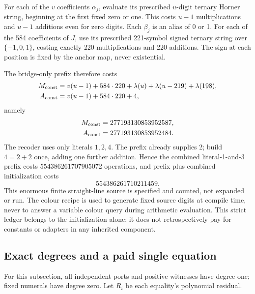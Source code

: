 \documentclass[11pt,letterpaper]{article}
\theoremstyle{definition}\newtheorem{definition}[theorem]{Definition}
\theoremstyle{remark}\newtheorem{remark}[theorem]{Remark}
\begin{document}
For each of the $v$ coefficients $\alpha_j$, evaluate its prescribed $u$-digit ternary Horner string, beginning at the first fixed zero or one. This costs $u-1$ multiplications and $u-1$ additions even for zero digits. Each $\beta_j$ is an alias of 0 or 1. For each of the 584 coefficients of $J$, use its prescribed 221-symbol signed ternary string over $\{-1,0,1\}$, costing exactly 220 multiplications and 220 additions. The sign at each position is fixed by the anchor map, never existential.

The bridge-only prefix therefore costs
\begin{align*}
 M_{\rm const}&=v(u-1)+584\cdot220+\lambda(u)+\lambda(u-219)+\lambda(198),\\
 A_{\rm const}&=v(u-1)+584\cdot220+4,
\end{align*}
namely
\[
 \begin{aligned}
 M_{\rm const}&=277193130853952587,\\
 A_{\rm const}&=277193130853952484.
 \end{aligned}
\]
The recoder uses only literals $1,2,4$. The prefix already supplies 2; build $4=2+2$ once, adding one further addition. Hence the combined literal-1-and-3 prefix costs $554386261707905072$ operations, and prefix plus combined initialization costs
\begin{equation}\label{ptr:ai:eq:strictotal}
 554386261710211459.
\end{equation}
This enormous finite straight-line source is specified and counted, not expanded or run. The colour recipe is used to generate fixed source digits at compile time, never to answer a variable colour query during arithmetic evaluation. This strict ledger belongs to the initialization alone; it does not retrospectively pay for constants or adapters in any inherited component.

\subsection{Exact degrees and a paid single equation}\label{ptr:ai:sec:degree}
For this subsection, all independent ports and positive witnesses have degree one; fixed numerals have degree zero. Let $R_i$ be each equality's polynomial residual.
\end{document}
